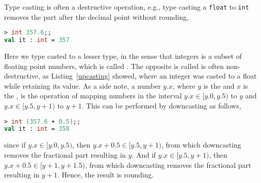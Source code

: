 Type casting is often a destructive operation, e.g., type casting a \lstinline{float} to \lstinline{int} removes the part after the decimal point without rounding,
%
\begin{lstlisting}[language=fsharp,caption={fsharpi, Fractional part is removed by downcasting.}]
> int 357.6;;
val it : int = 357
\end{lstlisting}
%
Here we type casted to a lesser type, in the sense that integers is a subset of floating point numbers, which is called . The opposite is called  is often non-destructive, as Listing~\ref{upcasting} showed, where an integer was casted to a float while retaining its value. As a side note,  a number $y.x$, where $y$ is the  and $x$ is the , is the operation of mapping numbers in the interval $y.x \in [y.0,y.5)$ to $y$ and $y.x\in [y.5,y+1)$ to $y+1$. This can be performed by downcasting as follows,
%
\begin{lstlisting}[language=fsharp,label=rounding,caption={fsharpi, Fractional part is removed by downcasting.}]
> int (357.6 + 0.5);;
val it : int = 358
\end{lstlisting}
%
since if $y.x\in [y.0, y.5)$, then $y.x+0.5\in [y.5, y+1)$, from which downcasting removes the fractional part resulting in $y$. And if $y.x\in [y.5, y+1)$, then $y.x+0.5\in [y+1,y+1.5)$, from which downcasting removes the fractional part resulting in $y+1$. Hence, the result is rounding. 


